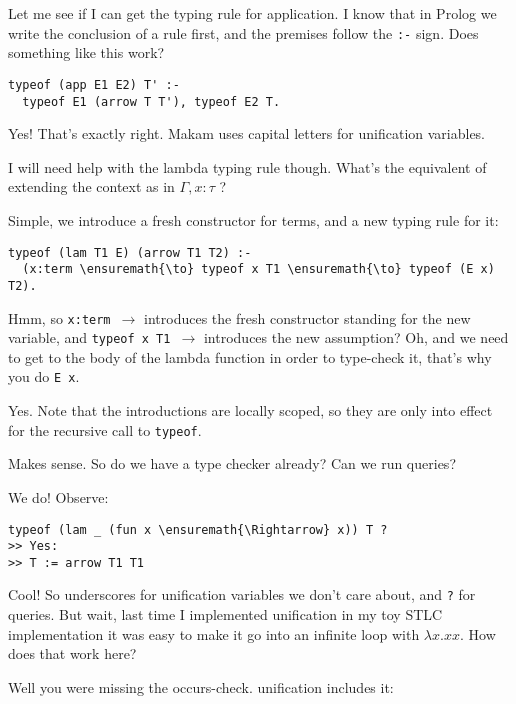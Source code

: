 Let me see if I can get the typing rule for application. I know
that in Prolog we write the conclusion of a rule first, and the premises
follow the \texttt{:-} sign. Does something like this work?

\begin{verbatim}
typeof (app E1 E2) T' :-
  typeof E1 (arrow T T'), typeof E2 T.
\end{verbatim}

 Yes! That's exactly right. Makam uses capital letters for
unification variables.

 I will need help with the lambda typing rule though. What's the
equivalent of extending the context as in \(\Gamma, x : \tau\) ?

 Simple, we introduce a fresh constructor for terms, and a new
typing rule for it:

\begin{verbatim}
typeof (lam T1 E) (arrow T1 T2) :-
  (x:term \ensuremath{\to} typeof x T1 \ensuremath{\to} typeof (E x) T2).
\end{verbatim}

 Hmm, so \texttt{x:term\ \ensuremath{\to}} introduces the fresh
constructor standing for the new variable, and
\texttt{typeof\ x\ T1\ \ensuremath{\to}} introduces the new assumption?
Oh, and we need to get to the body of the lambda function in order to
type-check it, that's why you do \texttt{E\ x}.

 Yes. Note that the introductions are locally scoped, so they
are only into effect for the recursive call to \texttt{typeof}.

 Makes sense. So do we have a type checker already? Can we run
queries?

 We do! Observe:

\begin{verbatim}
typeof (lam _ (fun x \ensuremath{\Rightarrow} x)) T ?
>> Yes:
>> T := arrow T1 T1
\end{verbatim}

 Cool! So underscores for unification variables we don't care
about, and \texttt{?} for queries. But wait, last time I implemented
unification in my toy STLC implementation it was easy to make it go into
an infinite loop with \(\lambda x. x x\). How does that work here?

 Well you were missing the occurs-check. \lamprolog unification
includes it:

